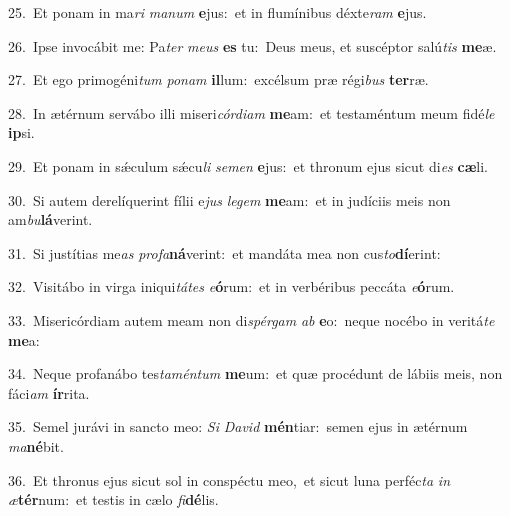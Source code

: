 {\numbfont\textcolor{\numbcolor}{25.}}~Et ponam in ma\textit{ri} \textit{ma}\-\textit{num} \textbf{e}\-jus:~\star et in flumínibus déxte\textit{ram} \textbf{e}\-jus.\par
{\numbfont\textcolor{\numbcolor}{26.}}~Ipse invocábit me: Pa\textit{ter} \textit{me}\-\textit{us} \textbf{es} tu:~\star Deus meus, et suscéptor salú\textit{tis} \textbf{me}\-æ.\par
{\numbfont\textcolor{\numbcolor}{27.}}~Et ego primogéni\textit{tum} \textit{po}\-\textit{nam} \textbf{il}\-lum:~\star excélsum præ régi\textit{bus} \textbf{ter}\-ræ.\par
{\numbfont\textcolor{\numbcolor}{28.}}~In ætérnum servábo illi miseri\-\textit{cór}\-\textit{di}\textit{am} \textbf{me}\-am:~\star et testaméntum meum fidé\textit{le} \textbf{ip}\-si.\par
{\numbfont\textcolor{\numbcolor}{29.}}~Et ponam in sǽculum sǽcu\textit{li} \textit{se}\-\textit{men} \textbf{e}\-jus:~\star et thronum ejus sicut di\textit{es} \textbf{cæ}\-li.\par
{\numbfont\textcolor{\numbcolor}{30.}}~Si autem derelíquerint fílii e\textit{jus} \textit{le}\-\textit{gem} \textbf{me}\-am:~\star et in judíciis meis non am\-\textit{bu}\-\textbf{lá}verint.\par
{\numbfont\textcolor{\numbcolor}{31.}}~Si justítias me\textit{as} \textit{pro}\-\textit{fa}\textbf{ná}verint:~\star et mandáta mea non cus\-\textit{to}\-\textbf{dí}erint:\par
{\numbfont\textcolor{\numbcolor}{32.}}~Visitábo in virga iniqui\-\textit{tá}\-\textit{tes} \textit{e}\-\textbf{ó}rum:~\star et in verbéribus peccáta \textit{e}\-\textbf{ó}rum.\par
{\numbfont\textcolor{\numbcolor}{33.}}~Misericórdiam autem meam non di\-\textit{spér}\-\textit{gam} \textit{ab} \textbf{e}\-o:~\star neque nocébo in veritá\textit{te} \textbf{me}\-a:\par
{\numbfont\textcolor{\numbcolor}{34.}}~Neque profanábo tes\-\textit{ta}\-\textit{mén}\textit{tum} \textbf{me}\-um:~\star et quæ procédunt de lábiis meis, non fáci\textit{am} \textbf{ír}\-rita.\par
{\numbfont\textcolor{\numbcolor}{35.}}~Semel jurávi in sancto meo: \textit{Si} \textit{Da}\-\textit{vid} \textbf{mén}\-tiar:~\star semen ejus in ætérnum \textit{ma}\-\textbf{né}bit.\par
{\numbfont\textcolor{\numbcolor}{36.}}~Et thronus ejus sicut sol in conspéctu meo,~\dagger et sicut luna perféc\textit{ta} \textit{in} \textit{æ}\-\textbf{tér}num:~\star et testis in cælo \textit{fi}\-\textbf{dé}lis.\par
